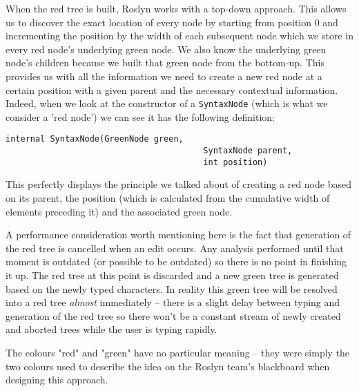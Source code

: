 \medskip

When the red tree is built, Roslyn works with a top-down approach. This allows us to discover the exact location of every node by starting from position 0 and incrementing the position by the width of each subsequent node which we store in every red node's underlying green node. We also know the underlying green node's children because we built that green node from the bottom-up. This provides us with all the information we need to create a new red node at a certain position with a given parent and the necessary contextual information. Indeed, when we look at the constructor of a \verb|SyntaxNode| (which is what we consider a 'red node') we can see it has the following definition:

\begin{lstlisting}
internal SyntaxNode(GreenNode green, 
										SyntaxNode parent, 
										int position)
\end{lstlisting}

This perfectly displays the principle we talked about of creating a red node based on its parent, the position (which is calculated from the cumulative width of elements preceding it) and the associated green node.

\medskip

A performance consideration worth mentioning here is the fact that generation of the red tree is cancelled when an edit occurs. Any analysis performed until that moment is outdated (or possible to be outdated) so there is no point in finishing it up. The red tree at this point is discarded and a new green tree is generated based on the newly typed characters. In reality this green tree will be resolved into a red tree \textit{almost} immediately -- there is a slight delay between typing and generation of the red tree so there won't be a constant stream of newly created and aborted trees while the user is typing rapidly.

The colours "red" and "green" have no particular meaning -- they were simply the two colours used to describe the idea on the Roslyn team's blackboard when designing this approach\cite{Lippert2012}.

